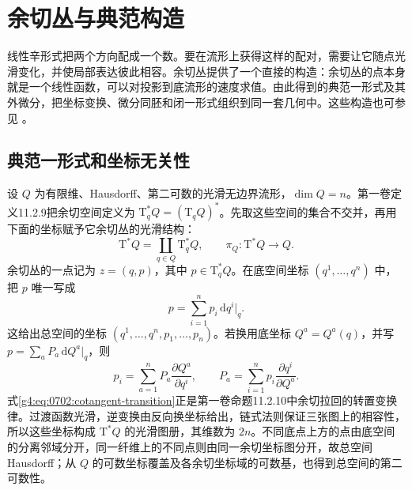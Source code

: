 
% 
% 

\section{余切丛与典范构造}
\label{g4:sec:0702}

线性辛形式把两个方向配成一个数。要在流形上获得这样的配对，需要让它随点光滑变化，并使局部表达彼此相容。余切丛提供了一个直接的构造：余切丛的点本身就是一个线性函数，可以对投影到底流形的速度求值。由此得到的典范一形式及其外微分，把坐标变换、微分同胚和闭一形式组织到同一套几何中。这些构造也可参见 \cite[第1.3节，第85--88页；第2.1节，第93--94页]{Cannas2006Symplectic}。

\subsection{典范一形式和坐标无关性}
\label{g4:subsec:0702:01}

设 \(Q\) 为有限维、Hausdorff、第二可数的光滑无边界流形，\(\dim Q=n\)。第一卷定义11.2.9把余切空间定义为 \(\mathrm{T}_q^*Q=(\mathrm{T}_qQ)^*\)。先取这些空间的集合不交并，再用下面的坐标赋予它余切丛的光滑结构：
\[
	\mathrm{T}^*Q=\coprod_{q\in Q}\mathrm{T}_q^*Q,
	\qquad \pi_Q:\mathrm{T}^*Q\longrightarrow Q.
\]
余切丛的一点记为 \(z=(q,p)\)，其中 \(p\in\mathrm{T}_q^*Q\)。在底空间坐标 \((q^1,\ldots,q^n)\) 中，把 \(p\) 唯一写成
\[
	p=\sum_{i=1}^n p_i\,\mathrm{d}q^i|_q.
\]
这给出总空间的坐标 \((q^1,\ldots,q^n,p_1,\ldots,p_n)\)。若换用底坐标 \(Q^a=Q^a(q)\)，并写 \(p=\sum_aP_a\,\mathrm{d}Q^a|_q\)，则
\begin{equation}
	\label{g4:eq:0702:cotangent-transition}
	p_i=\sum_{a=1}^nP_a\frac{\partial Q^a}{\partial q^i},
	\qquad
	P_a=\sum_{i=1}^np_i\frac{\partial q^i}{\partial Q^a}.
\end{equation}
式\eqref{g4:eq:0702:cotangent-transition}正是第一卷命题11.2.10中余切拉回的转置变换律。过渡函数光滑，逆变换由反向换坐标给出，链式法则保证三张图上的相容性，所以这些坐标构成 \(\mathrm{T}^*Q\) 的光滑图册，其维数为 \(2n\)。不同底点上方的点由底空间的分离邻域分开，同一纤维上的不同点则由同一余切坐标图分开，故总空间 Hausdorff；从 \(Q\) 的可数坐标覆盖及各余切坐标域的可数基，也得到总空间的第二可数性。

\ProseParagraphBreak

